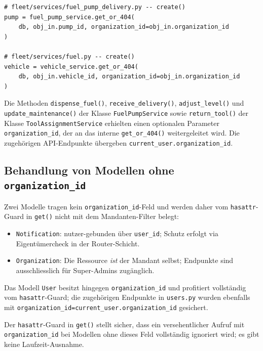 \begin{lstlisting}[style=custompython, caption={Service-interner Cross-Service-Lookup mit org-Check}]
# fleet/services/fuel_pump_delivery.py -- create()
pump = fuel_pump_service.get_or_404(
    db, obj_in.pump_id, organization_id=obj_in.organization_id
)

# fleet/services/fuel.py -- create()
vehicle = vehicle_service.get_or_404(
    db, obj_in.vehicle_id, organization_id=obj_in.organization_id
)
\end{lstlisting}

Die Methoden \texttt{dispense\_fuel()}, \texttt{receive\_delivery()},
\texttt{adjust\_level()} und \texttt{update\_maintenance()} der Klasse
\texttt{FuelPumpService} sowie \texttt{return\_tool()} der Klasse
\texttt{ToolAssignmentService} erhielten einen optionalen Parameter
\texttt{organization\_id}, der an das interne \texttt{get\_or\_404()}
weitergeleitet wird. Die zugehörigen API-Endpunkte übergeben
\texttt{current\_user.organization\_id}.

\subsection{Behandlung von Modellen ohne \texttt{organization\_id}}
\label{sec:patch-no-org}

Zwei Modelle tragen kein \texttt{organization\_id}-Feld und werden
daher vom \texttt{hasattr}-Guard in \texttt{get()} nicht mit dem
Mandanten-Filter belegt:

\begin{itemize}
    \item \texttt{Notification}: nutzer-gebunden über \texttt{user\_id};
          Schutz erfolgt via Eigentümercheck in der Router-Schicht.
    \item \texttt{Organization}: Die Ressource \emph{ist} der Mandant selbst;
          Endpunkte sind ausschliesslich für Super-Admins zugänglich.
\end{itemize}

Das Modell \texttt{User} besitzt hingegen \texttt{organization\_id} und
profitiert vollständig vom \texttt{hasattr}-Guard; die zugehörigen
Endpunkte in \texttt{users.py} wurden ebenfalls mit
\texttt{organization\_id=current\_user.organization\_id} gesichert.

Der \texttt{hasattr}-Guard in \texttt{get()} stellt sicher, dass ein
versehentlicher Aufruf mit \texttt{organization\_id} bei Modellen ohne
dieses Feld vollständig ignoriert wird; es gibt keine Laufzeit-Ausnahme.
